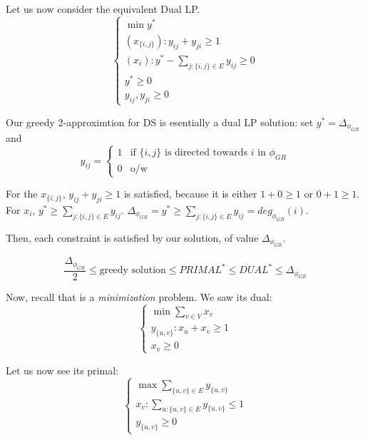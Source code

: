     Let us now consider the equivalent Dual LP.
    \begin{equation}
        \begin{cases}
            \min y^*\\
            (x_{\{i,j\}}): y_{ij} + y_{ji} \geq 1\\
            (x_i): y^* - \sum_{j : \{i,j\} \in E} y_{ij} \geq 0\\
            y^* \geq 0\\
            y_{ij}, y_{ji} \geq 0
        \end{cases}
    \end{equation}

    Our greedy 2-approximtion for DS is esentially a dual LP solution:
    set $y^* = \Delta_{\phi_{GR}}$ and
    \begin{equation}
        y_{ij} = 
        \begin{cases}
            1 & \text{if } \{i,j\} \text{ is directed towards } i \text{ in } \phi_{GR}\\
            0 & \text{o/w}
        \end{cases}
    \end{equation}

    For the $x_{\{i,j\}}$, $y_{ij} + y_{ji} \geq 1$ is satisfied, because it is either $1+0 \geq 1$ or $0+1 \geq 1$.
    For $x_i$, $y^* \geq \sum_{j : \{i,j\} \in E} y_{ij}$. $\Delta_{\phi_{GR}} = y^* \geq \sum_{j : \{i,j\} \in E} y_{ij} = deg_{\phi_{GR}}(i)$.

    Then, each constraint is satisfied by our solution, of value $\Delta_{\phi_{GR}}$.

    \[ \dfrac{\Delta_{\phi_{GR}}}{2} \leq \text{greedy solution} \leq PRIMAL^* \leq DUAL^* \leq \Delta_{\phi_{GR}} \]

    Now, recall that  is a \textit{minimization} problem.
    We saw its dual:
    \begin{equation}
        \begin{cases}
            \min \sum_{v \in V} x_v\\
            y_{\{u,v\}}: x_u + x_v \geq 1\\
            x_v \geq 0
        \end{cases}
    \end{equation}

    Let us now see its primal:
    \begin{equation}
        \begin{cases}
            \max \sum_{\{u,v\} \in E} y_{\{u,v\}}\\
            x_v: \sum_{u : \{u,v\} \in E} y_{\{u,v\}} \leq 1\\
            y_{\{u,v\}} \geq 0
        \end{cases}
    \end{equation}


